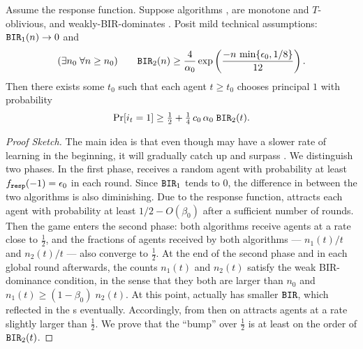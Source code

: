 \begin{theorem}\label{thm:SoftMax-strong}
Assume the \SoftMaxRandom response function. Suppose algorithms \alg[1], \alg[2] are monotone and $T$-oblivious, and \alg[1] weakly-BIR-dominates \alg[2]. Posit mild technical assumptions:
  $\mathtt{BIR}_1(n) \to 0$ and
\begin{align}\label{eq:SoftMax-assn-strong}
(\exists n_0\; \forall n\geq n_0) \qquad
\mathtt{BIR}_2(n) \geq \frac{4}{\alpha_0}
\exp \left( \frac{-n\,\min\{\epsilon_0, 1/8\}}{12}\right).
\end{align}
Then there
  exists some $t_0$ such that each agent $t\geq t_0$ chooses principal
  $1$ with probability
\begin{align}\label{eq:thm:SoftMax-strong}
     \Pr[i_t = 1]\geq \tfrac12 +  \tfrac14 \,c_0\,\alpha_0\; \mathtt{BIR}_2(t).
\end{align}
\end{theorem}


\begin{proof}[Proof Sketch]
The main idea is that even though \alg[1] may have a
slower rate of learning in the beginning, it will gradually catch up
and surpass \alg[2]. We distinguish two phases. In
the first phase, \alg[1] receives a random agent with probability at
least $f_{\mathtt{resp}}(-1) = \epsilon_0$ in each round. Since $\mathtt{BIR}_1$ tends to 0,
the difference in  between the two algorithms is also
diminishing. Due to the \SoftMaxRandom response function, \alg[1]
attracts each agent with probability at least $1/2 - O(\beta_0)$ after
a sufficient number of rounds. Then the game enters the second phase:
both algorithms receive agents at a rate close to $\tfrac12$, and the
fractions of agents received by both algorithms --- $n_1(t)/t$ and
$n_2(t)/t$ --- also converge to $\tfrac12$. At the end of the second
phase and in each global round afterwards, the counts $n_1(t)$ and
$n_2(t)$ satisfy the weak BIR-dominance condition, in the sense that
they both are larger than $n_0$ and $n_1(t)\geq (1-\beta_0)\; n_2(t)$.
At this point, \alg[1] actually has smaller $\mathtt{BIR}$, which reflected in the {\PMR}s eventually. Accordingly, from then on \alg[1]
attracts agents at a rate slightly larger than $\tfrac12$. We prove
that the ``bump'' over $\tfrac12$ is at least on the order of
$\mathtt{BIR}_2(t)$.
\end{proof}

